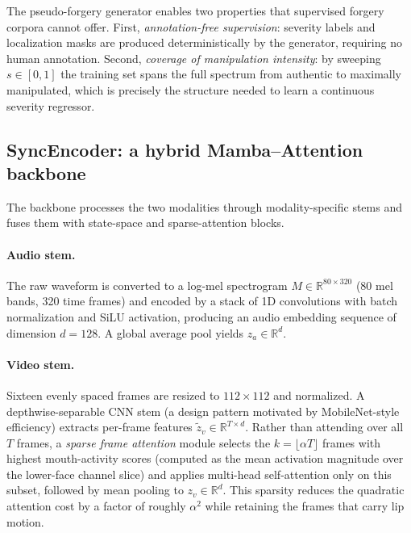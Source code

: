 \documentclass[sn-basic,Numbered,referee]{sn-jnl}
\begin{document}
The pseudo-forgery generator enables two properties that supervised forgery corpora cannot offer. First, \emph{annotation-free supervision}: severity labels and localization masks are produced deterministically by the generator, requiring no human annotation. Second, \emph{coverage of manipulation intensity}: by sweeping $s \in [0,1]$ the training set spans the full spectrum from authentic to maximally manipulated, which is precisely the structure needed to learn a continuous severity regressor.

\subsection{SyncEncoder: a hybrid Mamba--Attention backbone}
\label{sec:encoder}

The backbone processes the two modalities through modality-specific stems and fuses them with state-space and sparse-attention blocks.

\paragraph{Audio stem.}
The raw waveform is converted to a log-mel spectrogram $M \in \mathbb{R}^{80 \times 320}$ (80 mel bands, 320 time frames) and encoded by a stack of 1D convolutions with batch normalization and SiLU activation, producing an audio embedding sequence of dimension $d = 128$. A global average pool yields $z_a \in \mathbb{R}^{d}$.

\paragraph{Video stem.}
Sixteen evenly spaced frames are resized to $112 \times 112$ and normalized. A depthwise-separable CNN stem (a design pattern motivated by MobileNet-style efficiency) extracts per-frame features $\tilde{z}_v \in \mathbb{R}^{T \times d}$. Rather than attending over all $T$ frames, a \emph{sparse frame attention} module selects the $k = \lfloor \alpha T \rfloor$ frames with highest mouth-activity scores (computed as the mean activation magnitude over the lower-face channel slice) and applies multi-head self-attention only on this subset, followed by mean pooling to $z_v \in \mathbb{R}^d$. This sparsity reduces the quadratic attention cost by a factor of roughly $\alpha^2$ while retaining the frames that carry lip motion.
\end{document}
